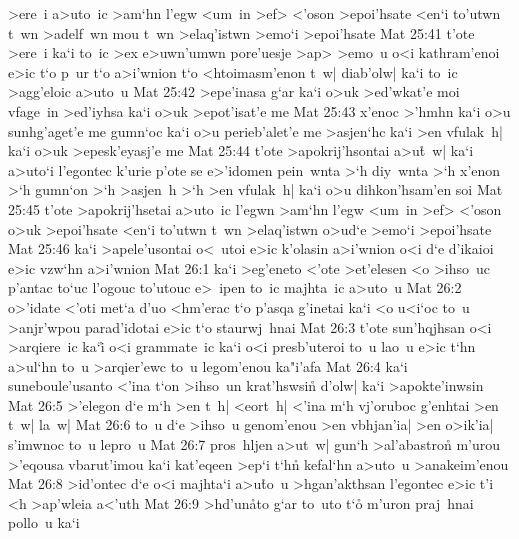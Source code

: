 >ere~i
a>uto~ic
>am`hn
l'egw
<um~in
>ef>
<'oson
>epoi'hsate
<en`i
to'utwn
t~wn
>adelf~wn
mou
t~wn
>elaq'istwn
>emo`i
>epoi'hsate\bibvsend
\vs Mat 25:41
t'ote
>ere~i
ka`i
to~ic
>ex
e>uwn'umwn
pore'uesje
>ap>
>emo~u
o<i
kathram'enoi
e>ic
t`o
p~ur
t`o
a>i'wnion
t`o
<htoimasm'enon
t~w|
diab'olw|
ka`i
to~ic
>agg'eloic
a>uto~u\bibvsend
\vs Mat 25:42
>epe'inasa
g`ar
ka`i
o>uk
>ed'wkat'e
moi
vfage~in
>ed'iyhsa
ka`i
o>uk
>epot'isat'e
me\bibvsend
\vs Mat 25:43
x'enoc
>'hmhn
ka`i
o>u
sunhg'aget'e
me
gumn`oc
ka`i
o>u
perieb'alet'e
me
>asjen`hc
ka`i
>en
vfulak~h|
ka`i
o>uk
>epesk'eyasj'e
me\bibvsend
\vs Mat 25:44
t'ote
>apokrij'hsontai
a>u\r{t}~w|
ka`i
a>uto`i
l'egontec
k'urie
p'ote
se
e>'idomen
pein~wnta
>`h
diy~wnta
>`h
x'enon
>`h
gumn`on
>`h
>asjen~h
>`h
>en
vfulak~h|
ka`i
o>u
dihkon'hsam'en
soi\bibvsend
\vs Mat 25:45
t'ote
>apokrij'hsetai
a>uto~ic
l'egwn
>am`hn
l'egw
<um~in
>ef>
<'oson
o>uk
>epoi'hsate
<en`i
to'utwn
t~wn
>elaq'istwn
o>ud`e
>emo`i
>epoi'hsate\bibvsend
\vs Mat 25:46
ka`i
>apele'usontai
o<~utoi
e>ic
k'olasin
a>i'wnion
o<i
d`e
d'ikaioi
e>ic
vzw`hn
a>i'wnion\bibvsend
\vs Mat 26:1
ka`i
>eg'eneto
<'ote
>et'elesen
<o
>ihso~uc
p'antac
to`uc
l'ogouc
to'utouc
e>~ipen
to~ic
majhta~ic
a>uto~u\bibvsend
\vs Mat 26:2
o>'idate
<'oti
met`a
d'uo
<hm'erac
t`o
p'asqa
g'inetai
ka`i
<o
u<i`oc
to~u
>anjr'wpou
parad'idotai
e>ic
t`o
staurwj~hnai\bibvsend
\vs Mat 26:3
t'ote
sun'hqjhsan
o<i
>arqiere~ic
ka`i\r{}
o<i
grammate~ic
ka`i
o<i
presb'uteroi
to~u
lao~u
e>ic
t`hn
a>ul`hn
to~u
>arqier'ewc
to~u
legom'enou
ka"i'afa\bibvsend
\vs Mat 26:4
ka`i
suneboule'usanto
<'ina
t`on
>ihso~un
krat'hswsin\r{}
d'olw|
ka`i
>apokte'inwsin\bibvsend
\vs Mat 26:5
>'elegon
d`e
m`h
>en
t~h|
<eort~h|
<'ina
m`h
vj'oruboc
g'enhtai
>en
t~w|
la~w|\bibvsend
\vs Mat 26:6
to~u
d`e
>ihso~u
genom'enou
>en
vbhjan'ia|
>en
o>ik'ia|
s'imwnoc
to~u
lepro~u\bibvsend
\vs Mat 26:7
pros~hljen
a>ut~w|
gun`h
>al'abastron\r{}
m'urou
>'eqousa
vbarut'imou
ka`i
kat'eqeen
>ep`i
t`hn\r{}
kefal`hn
a>uto~u
>anakeim'enou\bibvsend
\vs Mat 26:8
>id'ontec
d`e
o<i
majhta`i
a>u\r{t}o~u
>hgan'akthsan
l'egontec
e>ic
t'i
<h
>ap'wleia
a<'uth\bibvsend
\vs Mat 26:9
>hd'un\r{a}to
g`ar
to~uto
t`o\r{}
m'uron
praj~hnai
pollo~u
ka`i
